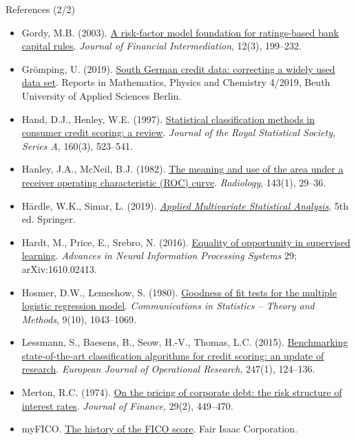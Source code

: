 \begin{frame}{References (2/2)}
\itemsize{\tiny}
\begin{itemize}
    \item Gordy, M.B. (2003). \href{https://doi.org/10.1016/S1042-9573(03)00040-8}{A risk-factor model foundation for ratings-based bank capital rules}. \textit{Journal of Financial Intermediation}, 12(3), 199--232.
    \item Grömping, U. (2019). \href{http://www1.beuth-hochschule.de/FB_II/reports/Report-2019-004.pdf}{South German credit data: correcting a widely used data set}. Reports in Mathematics, Physics and Chemistry 4/2019, Beuth University of Applied Sciences Berlin.
    \item Hand, D.J., Henley, W.E. (1997). \href{https://doi.org/10.1111/j.1467-985X.1997.00078.x}{Statistical classification methods in consumer credit scoring: a review}. \textit{Journal of the Royal Statistical Society, Series A}, 160(3), 523--541.
    \item Hanley, J.A., McNeil, B.J. (1982). \href{https://doi.org/10.1148/radiology.143.1.7063747}{The meaning and use of the area under a receiver operating characteristic (ROC) curve}. \textit{Radiology}, 143(1), 29--36.
    \item Härdle, W.K., Simar, L. (2019). \href{https://doi.org/10.1007/978-3-030-26006-4}{\textit{Applied Multivariate Statistical Analysis}}, 5th ed. Springer.
    \item Hardt, M., Price, E., Srebro, N. (2016). \href{https://arxiv.org/abs/1610.02413}{Equality of opportunity in supervised learning}. \textit{Advances in Neural Information Processing Systems} 29; arXiv:1610.02413.
    \item Hosmer, D.W., Lemeshow, S. (1980). \href{https://doi.org/10.1080/03610928008827941}{Goodness of fit tests for the multiple logistic regression model}. \textit{Communications in Statistics -- Theory and Methods}, 9(10), 1043--1069.
    \item Lessmann, S., Baesens, B., Seow, H.-V., Thomas, L.C. (2015). \href{https://doi.org/10.1016/j.ejor.2015.05.030}{Benchmarking state-of-the-art classification algorithms for credit scoring: an update of research}. \textit{European Journal of Operational Research}, 247(1), 124--136.
    \item Merton, R.C. (1974). \href{https://doi.org/10.1111/j.1540-6261.1974.tb03058.x}{On the pricing of corporate debt: the risk structure of interest rates}. \textit{Journal of Finance}, 29(2), 449--470.
    \item myFICO. \href{https://www.myfico.com/credit-education/blog/history-of-the-fico-score}{The history of the FICO score}. Fair Isaac Corporation.

\end{itemize}
\end{frame}
